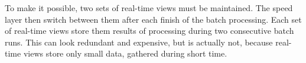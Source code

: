 To make it possible, two sets of real-time views must be maintained.
The speed layer then switch between them after each finish of the batch processing.
Each set of real-time views store them results of processing during two consecutive batch runs.
This can look redundant and expensive, but is actually not, because real-time views store only small data, gathered during short time.
